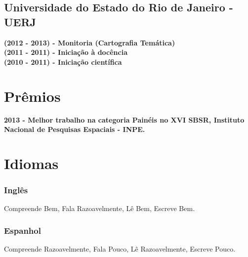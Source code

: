 \documentclass{article}
\begin{document}
\subsection{Universidade do Estado do Rio de Janeiro - UERJ}
\textbf{(2012 - 2013) - Monitoria (Cartografia Temática)} \\
\textbf{(2011 - 2011) - Iniciação à docência} \\
\textbf{(2010 - 2011) - Iniciação científica}


\section{Prêmios}
\textbf{2013 - Melhor trabalho na categoria Painéis no XVI SBSR, Instituto Nacional de Pesquisas Espaciais - INPE.}

\section{Idiomas}
\subsubsection{Inglês} 
Compreende Bem, Fala Razoavelmente, Lê Bem, Escreve Bem.
\subsubsection{Espanhol}
Compreende Razoavelmente, Fala Pouco, Lê Razoavelmente, Escreve Pouco.
\end{document}
